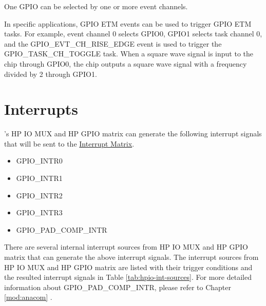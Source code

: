\documentclass[main\_\_EN.tex]{subfiles}
\begin{document}
\begin{tiplisting}
One GPIO can be selected by one or more event channels.
\end{tiplisting}

In specific applications, GPIO ETM events can be used to trigger GPIO ETM tasks. For example, event channel 0 selects GPIO0, GPIO1 selects task channel 0, and the GPIO\_EVT\_CH\_RISE\_EDGE event is used to trigger the GPIO\_TASK\_CH\_TOGGLE task. When a square wave signal is input to the chip through GPIO0, the chip outputs a square wave signal with a frequency divided by 2 through GPIO1.


\section{Interrupts}

\chipname{}'s HP IO MUX and HP GPIO matrix can generate the following interrupt signals that will be sent to the \hyperref[mod:intmtrx]{Interrupt Matrix}.

    \begin{itemize}
        \item GPIO\_INTR0
        \item GPIO\_INTR1
        \item GPIO\_INTR2
        \item GPIO\_INTR3
        \item GPIO\_PAD\_COMP\_INTR
    \end{itemize}

There are several internal interrupt sources from HP IO MUX and HP GPIO matrix that can generate the above interrupt signals. The interrupt sources from HP IO MUX and HP GPIO matrix are listed with their trigger conditions and the resulted interrupt signals in Table \ref{tab:hpio-int-sources}. For more detailed information about GPIO\_PAD\_COMP\_INTR, please refer to Chapter \ref{mod:anacom} \textit{}.
\end{document}
